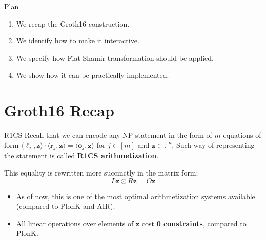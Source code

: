 \documentclass{zkdl-presentation-template}
\begin{document}
    \begin{frame}{Plan}
        \begin{enumerate}
            \item We recap the Groth16 construction.
            \item We identify how to make it interactive.
            \item We specify how Fiat-Shamir transformation should be applied.
            \item We show how it can be practically implemented.
        \end{enumerate}
    \end{frame}

    \section{Groth16 Recap}

    \begin{frame}{R1CS}
        Recall that we can encode any NP statement in the form of $m$ equations
        of form $\langle \boldsymbol{\ell}_j, \mathbf{z} \rangle \cdot \langle
        \boldsymbol{r}_j, \mathbf{z} \rangle = \langle \boldsymbol{o}_j,
        \mathbf{z} \rangle$ for $j \in [m]$ and $\mathbf{z} \in \mathbb{F}^n$.
        Such way of representing the statement is called \textbf{R1CS
        arithmetization}.

        This equality is rewritten more succinctly in the matrix form:
        \begin{equation*}
            L\mathbf{z} \odot R\mathbf{z} = O\mathbf{z}
        \end{equation*}

        \begin{itemize}[label=\textcolor{green!70!black}{}]
            \item As of now, this is one of the most optimal arithmetization
            systems available (compared to PlonK and AIR).
            \item All linear operations over elements of $\mathbf{z}$ cost
            \textbf{0 constraints}, compared to PlonK.
        \end{itemize}
    \end{frame}
\end{document}

